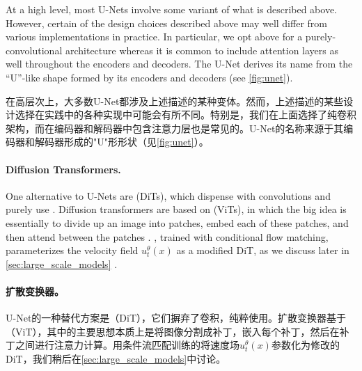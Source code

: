 At a high level, most U-Nets involve some variant of what is described above. However, certain of the design choices described above may well differ from various implementations in practice. In particular, we opt above for a purely-convolutional architecture whereas it is common to include attention layers as well throughout the encoders and decoders. The U-Net derives its name from the ``U''-like shape formed by its encoders and decoders (see \cref{fig:unet}).

在高层次上，大多数U-Net都涉及上述描述的某种变体。然而，上述描述的某些设计选择在实践中的各种实现中可能会有所不同。特别是，我们在上面选择了纯卷积架构，而在编码器和解码器中包含注意力层也是常见的。U-Net的名称来源于其编码器和解码器形成的"U"形形状（见\cref{fig:unet}）。

\paragraph{Diffusion Transformers.} One alternative to U-Nets are  (DiTs), which dispense with convolutions and purely use  \cite{attention, dit}. Diffusion transformers are based on  (ViTs), in which the big idea is essentially to divide up an image into patches, embed each of these patches, and then attend between the patches \cite{vit}. , trained with conditional flow matching, parameterizes the velocity field $u_t^{\theta}(x)$ as a modified DiT, as we discuss later in \cref{sec:large_scale_models} \cite{sd3}.

\paragraph{扩散变换器。} U-Net的一种替代方案是（DiT），它们摒弃了卷积，纯粹使用\cite{attention, dit}。扩散变换器基于（ViT），其中的主要思想本质上是将图像分割成补丁，嵌入每个补丁，然后在补丁之间进行注意力计算\cite{vit}。用条件流匹配训练的将速度场$u_t^{\theta}(x)$参数化为修改的DiT，我们稍后在\cref{sec:large_scale_models}中讨论\cite{sd3}。

